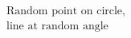 \documentclass[preview]{standalone}
\begin{document}
\begin{align*}
\text{Random point on circle,}\\ \text{line at random angle}
\end{align*}
\end{document}
